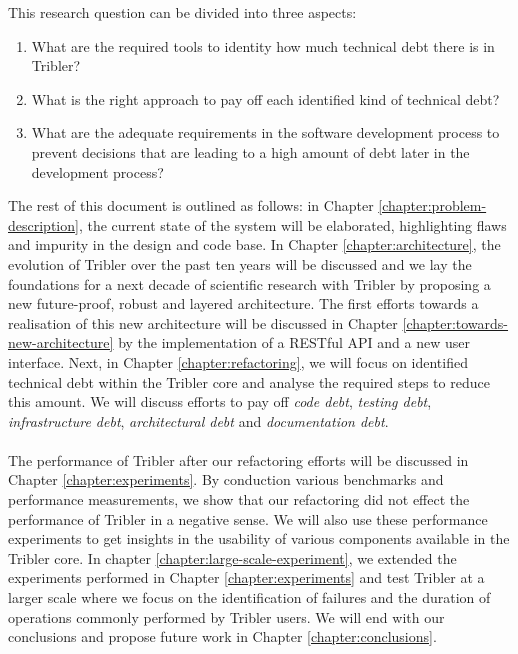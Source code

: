 This research question can be divided into three aspects:
\begin{enumerate}
	\item What are the required tools to identity how much technical debt there is in Tribler?
	\item What is the right approach to pay off each identified kind of technical debt?
	\item What are the adequate requirements in the software development process to prevent decisions that are leading to a high amount of debt later in the development process?
\end{enumerate}
The rest of this document is outlined as follows: in Chapter \ref{chapter:problem-description}, the current state of the system will be elaborated, highlighting flaws and impurity in the design and code base. 
In Chapter \ref{chapter:architecture}, the evolution of Tribler over the past ten years will be discussed and we lay the foundations for a next decade of scientific research with Tribler by proposing a new future-proof, robust and layered architecture.
The first efforts towards a realisation of this new architecture will be discussed in Chapter \ref{chapter:towards-new-architecture} by the implementation of a RESTful API and a new user interface.
Next, in Chapter \ref{chapter:refactoring}, we will focus on identified technical debt within the Tribler core and analyse the required steps to reduce this amount. 
We will discuss efforts to pay off \emph{code debt}, \emph{testing debt}, \emph{infrastructure debt}, \emph{architectural debt} and \emph{documentation debt}.\\\\
The performance of Tribler after our refactoring efforts will be discussed in Chapter \ref{chapter:experiments}.
By conduction various benchmarks and performance measurements, we show that our refactoring did not effect the performance of Tribler in a negative sense.
We will also use these performance experiments to get insights in the usability of various components available in the Tribler core.
In chapter \ref{chapter:large-scale-experiment}, we extended the experiments performed in Chapter \ref{chapter:experiments} and test Tribler at a larger scale where we focus on the identification of failures and the duration of operations commonly performed by Tribler users.
We will end with our conclusions and propose future work in Chapter \ref{chapter:conclusions}.
